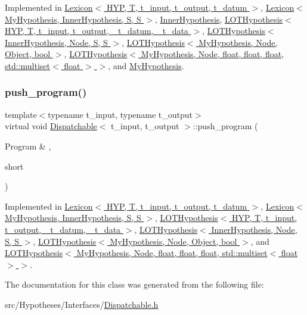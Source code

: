Implemented in \hyperlink{class_lexicon_a1c6b61ac505114f23441e3097163685b}{Lexicon$<$ H\+Y\+P, T, t\+\_\+input, t\+\_\+output, t\+\_\+datum $>$}, \hyperlink{class_lexicon_a1c6b61ac505114f23441e3097163685b}{Lexicon$<$ My\+Hypothesis, Inner\+Hypothesis, S, S $>$}, \hyperlink{class_inner_hypothesis_a9aea852725a3798aafeae5e7a5a0736b}{Inner\+Hypothesis}, \hyperlink{class_l_o_t_hypothesis_a6eae1ce4486971909e0245ab9e30ddeb}{L\+O\+T\+Hypothesis$<$ H\+Y\+P, T, t\+\_\+input, t\+\_\+output, \+\_\+t\+\_\+datum, \+\_\+t\+\_\+data $>$}, \hyperlink{class_l_o_t_hypothesis_a6eae1ce4486971909e0245ab9e30ddeb}{L\+O\+T\+Hypothesis$<$ Inner\+Hypothesis, Node, S, S $>$}, \hyperlink{class_l_o_t_hypothesis_a6eae1ce4486971909e0245ab9e30ddeb}{L\+O\+T\+Hypothesis$<$ My\+Hypothesis, Node, Object, bool $>$}, \hyperlink{class_l_o_t_hypothesis_a6eae1ce4486971909e0245ab9e30ddeb}{L\+O\+T\+Hypothesis$<$ My\+Hypothesis, Node, float, float, float, std\+::multiset$<$ float $>$ $>$}, and \hyperlink{class_my_hypothesis_a3de47a545e8824bb8c63181965c62a01}{My\+Hypothesis}.

\mbox{\label{class_dispatchable_a9339c2906f7c8dadbe1d0ca79dd9bb11}} 
\subsubsection{\texorpdfstring{push\+\_\+program()}{push\_program()}}
{\footnotesize\ttfamily template$<$typename t\+\_\+input, typename t\+\_\+output$>$ \\
virtual void \hyperlink{class_dispatchable}{Dispatchable}$<$ t\+\_\+input, t\+\_\+output $>$\+::push\+\_\+program (\begin{DoxyParamCaption}\item[{Program \&}]{,  }\item[{short}]{ }\end{DoxyParamCaption})\hspace{0.3cm}{\ttfamily [pure virtual]}}



Implemented in \hyperlink{class_lexicon_af85ffc6944b66e92f760aaf7e3521d23}{Lexicon$<$ H\+Y\+P, T, t\+\_\+input, t\+\_\+output, t\+\_\+datum $>$}, \hyperlink{class_lexicon_af85ffc6944b66e92f760aaf7e3521d23}{Lexicon$<$ My\+Hypothesis, Inner\+Hypothesis, S, S $>$}, \hyperlink{class_l_o_t_hypothesis_a0c0048d364936ae2a1bbeeca08959215}{L\+O\+T\+Hypothesis$<$ H\+Y\+P, T, t\+\_\+input, t\+\_\+output, \+\_\+t\+\_\+datum, \+\_\+t\+\_\+data $>$}, \hyperlink{class_l_o_t_hypothesis_a0c0048d364936ae2a1bbeeca08959215}{L\+O\+T\+Hypothesis$<$ Inner\+Hypothesis, Node, S, S $>$}, \hyperlink{class_l_o_t_hypothesis_a0c0048d364936ae2a1bbeeca08959215}{L\+O\+T\+Hypothesis$<$ My\+Hypothesis, Node, Object, bool $>$}, and \hyperlink{class_l_o_t_hypothesis_a0c0048d364936ae2a1bbeeca08959215}{L\+O\+T\+Hypothesis$<$ My\+Hypothesis, Node, float, float, float, std\+::multiset$<$ float $>$ $>$}.



The documentation for this class was generated from the following file\+:\begin{DoxyCompactItemize}
\item 
src/\+Hypotheses/\+Interfaces/\hyperlink{_dispatchable_8h}{Dispatchable.\+h}\end{DoxyCompactItemize}
